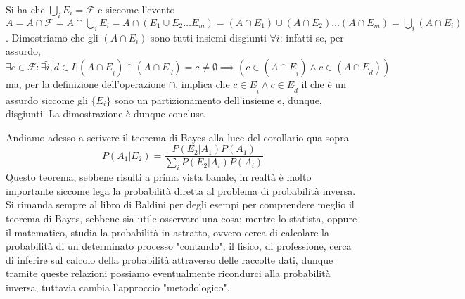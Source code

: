 \documentclass{report}
\begin{document}
\begin{myproof}
	Si ha che $\bigcup\limits_i E_i = \mathcal{F}$ e siccome l'evento $A = A \cap \mathcal{F} = A \cap \bigcup\limits_i E_i = A \cap (E_1 \cup E_2 \dots E_m) = (A \cap E_1) \cup (A \cap E_2) \dots (A \cap E_m) = \bigcup\limits_i (A \cap E_i)$. Dimostriamo che gli $(A \cap E_i)$ sono tutti insiemi disgiunti $\forall i$: infatti se, per assurdo, $\exists c \in \mathcal{F} : \exists \tilde{i}, \tilde{d} \in I | (A \cap E_{\tilde{i}}) \cap (A \cap E_{\tilde{d}}) = c \neq \emptyset \implies (c \in (A \cap E_{\tilde{i}}) \wedge c \in (A \cap E_{\tilde{d}}))$ ma, per la definizione dell'operazione $\cap$, implica che $c \in E_{\tilde{i}} \wedge c \in E_{\tilde{d}}$ il che è un assurdo siccome gli $\{ E_i \}$ sono un partizionamento dell'insieme e, dunque, disgiunti.
	La dimostrazione è dunque conclusa
\end{myproof}
\noindent Andiamo adesso a scrivere il teorema di Bayes alla luce del corollario qua sopra
\begin{equation}
	P(A_1 | E_2) = \frac{P(E_2 | A_1)P(A_1)}{\sum\limits_{i} P(E_2 | A_i)P(A_i)}
\end{equation}
Questo teorema, sebbene risulti a prima vista banale, in realtà è molto importante siccome lega la probabilità diretta al problema di probabilità inversa. Si rimanda sempre al libro di Baldini per degli esempi per comprendere meglio il teorema di Bayes, sebbene sia utile osservare una cosa: mentre lo statista, oppure il matematico, studia la probabilità in astratto, ovvero cerca di calcolare la probabilità di un determinato processo "contando"; il fisico, di professione, cerca di inferire sul calcolo della probabilità attraverso delle raccolte dati, dunque tramite queste relazioni possiamo eventualmente ricondurci alla probabilità inversa, tuttavia cambia l'approccio "metodologico".
\end{document}
